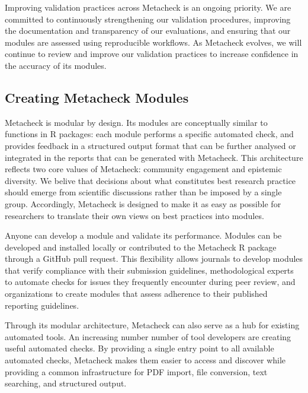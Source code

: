 \documentclass[
  letterpaper,
  12pt]{article}
\begin{document}
Improving validation practices across Metacheck is an ongoing priority.
We are committed to continuously strengthening our validation
procedures, improving the documentation and transparency of our
evaluations, and ensuring that our modules are assessed using
reproducible workflows. As Metacheck evolves, we will continue to review
and improve our validation practices to increase confidence in the
accuracy of its modules.

\subsection{Creating Metacheck
Modules}\label{creating-metacheck-modules}

Metacheck is modular by design. Its modules are conceptually similar to
functions in R packages: each module performs a specific automated
check, and provides feedback in a structured output format that can be
further analysed or integrated in the reports that can be generated with
Metacheck. This architecture reflects two core values of Metacheck:
community engagement and epistemic diversity. We belive that decisions
about what constitutes best research practice should emerge from
scientific discussions rather than be imposed by a single group.
Accordingly, Metacheck is designed to make it as easy as possible for
researchers to translate their own views on best practices into modules.

Anyone can develop a module and validate its performance. Modules can be
developed and installed locally or contributed to the Metacheck R
package through a GitHub pull request. This flexibility allows journals
to develop modules that verify compliance with their submission
guidelines, methodological experts to automate checks for issues they
frequently encounter during peer review, and organizations to create
modules that assess adherence to their published reporting guidelines.

Through its modular architecture, Metacheck can also serve as a hub for
existing automated tools. An increasing number number of tool developers
are creating useful automated checks. By providing a single entry point
to all available automated checks, Metacheck makes them easier to access
and discover while providing a common infrastructure for PDF import,
file conversion, text searching, and structured output.
\end{document}

